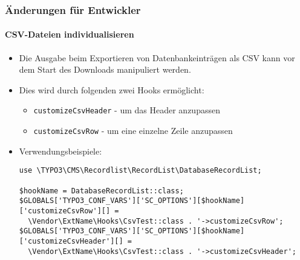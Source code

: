 
\begin{frame}[fragile]
	\frametitle{Änderungen für Entwickler}
	\framesubtitle{CSV-Dateien individualisieren}

	\lstset{basicstyle=\tiny\ttfamily}

	\begin{itemize}
		\item Die Ausgabe beim Exportieren von Datenbankeinträgen als CSV kann
			vor dem Start des Downloads manipuliert werden.
		\item Dies wird durch folgenden zwei Hooks ermöglicht:

			\begin{itemize}
			\smaller
				\item \texttt{customizeCsvHeader} - um das Header anzupassen
				\item \texttt{customizeCsvRow} - um eine einzelne Zeile anzupassen
			\end{itemize}

		\item Verwendungsbeispiele:

			\begin{lstlisting}
use \TYPO3\CMS\Recordlist\RecordList\DatabaseRecordList;

$hookName = DatabaseRecordList::class;
$GLOBALS['TYPO3_CONF_VARS']['SC_OPTIONS'][$hookName]['customizeCsvRow'][] =
  \Vendor\ExtName\Hooks\CsvTest::class . '->customizeCsvRow';
$GLOBALS['TYPO3_CONF_VARS']['SC_OPTIONS'][$hookName]['customizeCsvHeader'][] =
  \Vendor\ExtName\Hooks\CsvTest::class . '->customizeCsvHeader';
\end{lstlisting}

	\end{itemize}

\end{frame}


